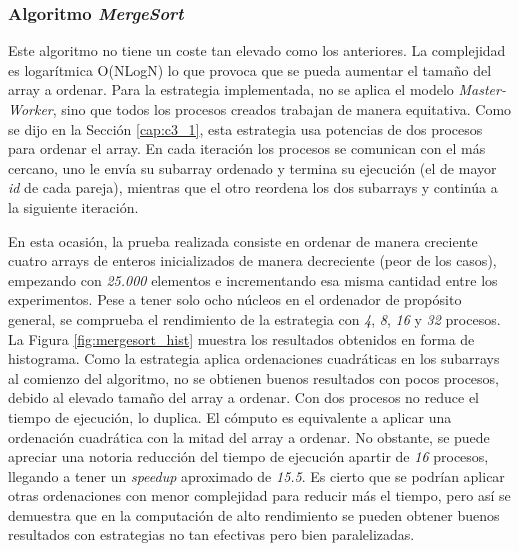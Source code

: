 		
		\subsubsection{Algoritmo \textit{MergeSort}}
		
		Este algoritmo no tiene un coste tan elevado como los anteriores. La complejidad es logarítmica O(NLogN) lo que provoca que se pueda aumentar el tamaño del array a ordenar. Para la estrategia implementada, no se aplica el modelo \textit{Master-Worker}, sino que todos los procesos creados trabajan de manera equitativa. Como se dijo en la Sección \ref{cap:c3_1}, esta estrategia usa potencias de dos procesos para ordenar el array. En cada iteración los procesos se comunican con el más cercano, uno le envía su subarray ordenado y termina su ejecución (el de mayor \textit{id} de cada pareja), mientras que el otro reordena los dos subarrays y continúa a la siguiente iteración.
					
		
		En esta ocasión, la prueba realizada consiste en ordenar de manera creciente cuatro arrays de enteros inicializados de manera decreciente (peor de los casos), empezando con \textit{25.000} elementos e incrementando esa misma cantidad entre los experimentos. Pese a tener solo ocho núcleos en el ordenador de propósito general, se comprueba el rendimiento de la estrategia con \textit{4}, \textit{8}, \textit{16} y \textit{32} procesos. La Figura \ref{fig:mergesort_hist} muestra los resultados obtenidos en forma de histograma. Como la estrategia aplica ordenaciones cuadráticas en los subarrays al comienzo del algoritmo, no se obtienen buenos resultados con pocos procesos, debido al elevado tamaño del array a ordenar. Con dos procesos no reduce el tiempo de ejecución, lo duplica. El cómputo es equivalente a aplicar una ordenación cuadrática con la mitad del array a ordenar. No obstante, se puede apreciar una notoria reducción del tiempo de ejecución apartir de \textit{16} procesos, llegando a tener un \textit{speedup} aproximado de \textit{15.5}. Es cierto que se podrían aplicar otras ordenaciones con menor complejidad para reducir más el tiempo, pero así se demuestra que en la computación de alto rendimiento se pueden obtener buenos resultados con estrategias no tan efectivas pero bien paralelizadas.
		
